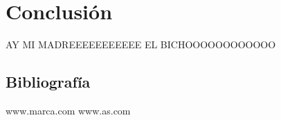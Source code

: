 \chapter{Conclusión}
	AY MI MADREEEEEEEEEEE EL BICHOOOOOOOOOOOO
	\section{Bibliografía}
	www.marca.com
	www.as.com